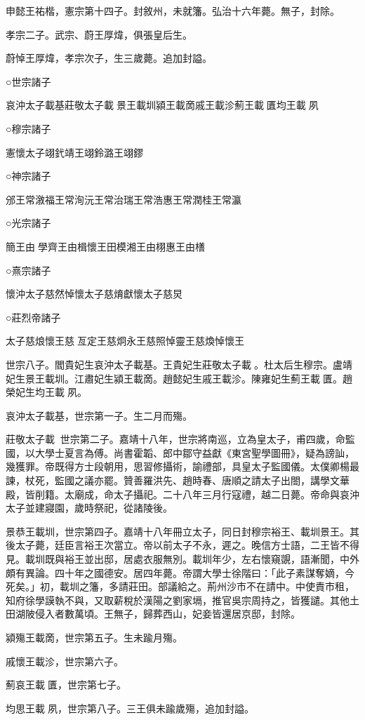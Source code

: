 申懿王祐楷，憲宗第十四子。封敘州，未就籓。弘治十六年薨。無子，封除。

孝宗二子。武宗、蔚王厚煒，俱張皇后生。

蔚悼王厚煒，孝宗次子，生三歲薨。追加封謚。

○世宗諸子

哀沖太子載基莊敬太子載景王載圳潁王載啇戚王載沴薊王載匱均王載夙

○穆宗諸子

憲懷太子翊釴靖王翊鈴潞王翊鏐

○神宗諸子

邠王常漵福王常洵沅王常治瑞王常浩惠王常潤桂王常瀛

○光宗諸子

簡王由學齊王由楫懷王田模湘王由栩惠王由橏

○熹宗諸子

懷沖太子慈然悼懷太子慈焴獻懷太子慈炅

○莊烈帝諸子

太子慈烺懷王慈亙定王慈炯永王慈照悼靈王慈煥悼懷王

世宗八子。閻貴妃生哀沖太子載基。王貴妃生莊敬太子載。杜太后生穆宗。盧靖妃生景王載圳。江肅妃生潁王載啇。趙懿妃生戚王載沴。陳雍妃生薊王載匱。趙榮妃生均王載夙。

哀沖太子載基，世宗第一子。生二月而殤。

莊敬太子載，世宗第二子。嘉靖十八年，世宗將南巡，立為皇太子，甫四歲，命監國，以大學士夏言為傅。尚書霍韜、郎中鄒守益獻《東宮聖學圖冊》，疑為謗訕，幾獲罪。帝既得方士段朝用，思習修攝術，諭禮部，具皇太子監國儀。太僕卿楊最諫，杖死，監國之議亦罷。贊善羅洪先、趙時春、唐順之請太子出閤，講學文華殿，皆削籍。太廟成，命太子攝祀。二十八年三月行寇禮，越二日薨。帝命與哀沖太子並建寢園，歲時祭祀，從諸陵後。

景恭王載圳，世宗第四子。嘉靖十八年冊立太子，同日封穆宗裕王、載圳景王。其後太子薨，廷臣言裕王次當立。帝以前太子不永，遲之。晚信方士語，二王皆不得見。載圳既與裕王並出邸，居處衣服無別。載圳年少，左右懷窺覬，語漸聞，中外頗有異論。四十年之國德安。居四年薨。帝謂大學士徐階曰：「此子素謀奪嫡，今死矣。」初，載圳之籓，多請莊田。部議給之。荊州沙市不在請中。中使責市租，知府徐學謨執不與，又取薪稅於漢陽之劉家塥，推官吳宗周持之，皆獲譴。其他土田湖陂侵入者數萬頃。王無子，歸葬西山，妃妾皆還居京邸，封除。

潁殤王載啇，世宗第五子。生未踰月殤。

戚懷王載沴，世宗第六子。

薊哀王載匱，世宗第七子。

均思王載夙，世宗第八子。三王俱未踰歲殤，追加封謚。

